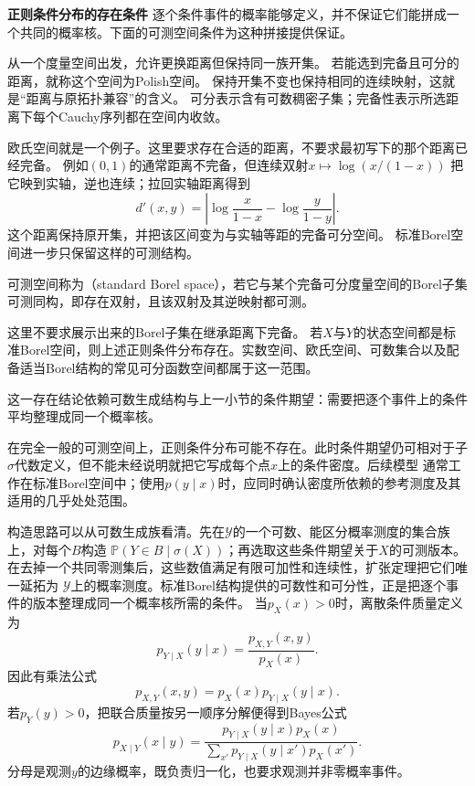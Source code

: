 \par\medskip\noindent\textbf{正则条件分布的存在条件}\quad
逐个条件事件的概率能够定义，并不保证它们能拼成一个共同的概率核。下面的可测空间条件为这种拼接提供保证。
\begin{definition}[Polish空间]
  \label{def:probability-polish-space}
从一个度量空间出发，允许更换距离但保持同一族开集。
若能选到完备且可分的距离，就称这个空间为Polish空间。
保持开集不变也保持相同的连续映射，这就是“距离与原拓扑兼容”的含义。
可分表示含有可数稠密子集；完备性表示所选距离下每个Cauchy序列都在空间内收敛。
\end{definition}
欧氏空间就是一个例子。这里要求存在合适的距离，不要求最初写下的那个距离已经完备。
例如\((0,1)\)的通常距离不完备，但连续双射\(x\mapsto\log(x/(1-x))\)
把它映到实轴，逆也连续；拉回实轴距离得到
\[
 d'(x,y)=\left|\log\frac{x}{1-x}-\log\frac{y}{1-y}\right|.
\]
这个距离保持原开集，并把该区间变为与实轴等距的完备可分空间。
标准Borel空间进一步只保留这样的可测结构。
\begin{definition}[标准Borel空间]
  \label{def:probability-standard-borel-space}
  可测空间称为（standard Borel space），若它与某个完备可分度量空间的Borel子集可测同构，即存在双射，且该双射及其逆映射都可测。
\end{definition}
这里不要求展示出来的Borel子集在继承距离下完备。
若\(X\)与\(Y\)的状态空间都是标准Borel空间，则上述正则条件分布存在。实数空间、欧氏空间、可数集合以及配备适当Borel结构的常见可分函数空间都属于这一范围。

这一存在结论依赖可数生成结构与上一小节的条件期望：需要把逐个事件上的条件平均整理成同一个概率核。

在完全一般的可测空间上，正则条件分布可能不存在。此时条件期望仍可相对于子\(\sigma\)代数定义，但不能未经说明就把它写成每个点\(x\)上的条件密度。后续模型
通常工作在标准Borel空间中；使用\(p(y\mid x)\)时，应同时确认密度所依赖的参考测度及其适用的几乎处处范围。

构造思路可以从可数生成族看清。先在\(\mathcal{Y}\)的一个可数、能区分概率测度的集合族上，对每个\(B\)构造
\(\mathbb{P}(Y\in B\mid\sigma(X))\)；再选取这些条件期望关于\(X\)的可测版本。在去掉一个共同零测集后，这些数值满足有限可加性和连续性，扩张定理把它们唯一延拓为
\(\mathcal{Y}\)上的概率测度。标准Borel结构提供的可数性和可分性，正是把逐个事件的版本整理成同一个概率核所需的条件。
当\(p_X(x)>0\)时，离散条件质量定义为
\[ p_{Y\mid X}(y\mid x)
  =\frac{p_{X,Y}(x,y)}{p_X(x)}. \]
因此有乘法公式
\[ p_{X,Y}(x,y)=p_X(x)p_{Y\mid X}(y\mid x). \]
若\(p_Y(y)>0\)，把联合质量按另一顺序分解便得到Bayes公式
\begin{equation}
  p_{X\mid Y}(x\mid y)
  =
  \frac{p_{Y\mid X}(y\mid x)p_X(x)}
       {\sum_{x'}p_{Y\mid X}(y\mid x')p_X(x')}.
  \label{eq:probability-discrete-bayes}
\end{equation}
分母是观测\(y\)的边缘概率，既负责归一化，也要求观测并非零概率事件。

